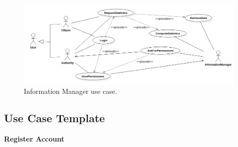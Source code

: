 \documentclass{report}
\begin{document}
\begin{figure}[ht!]
\begin{center}
\includegraphics[width=.8\textwidth]{./img/UseCase3.png}
\end{center}
\caption{Information Manager use case.}
\label{fig:UseCase3}
\end{figure}
\newpage
\subsection{Use Case Template}
\begin{center}
	\textbf{Register Account}
\end{center}
\end{document}
